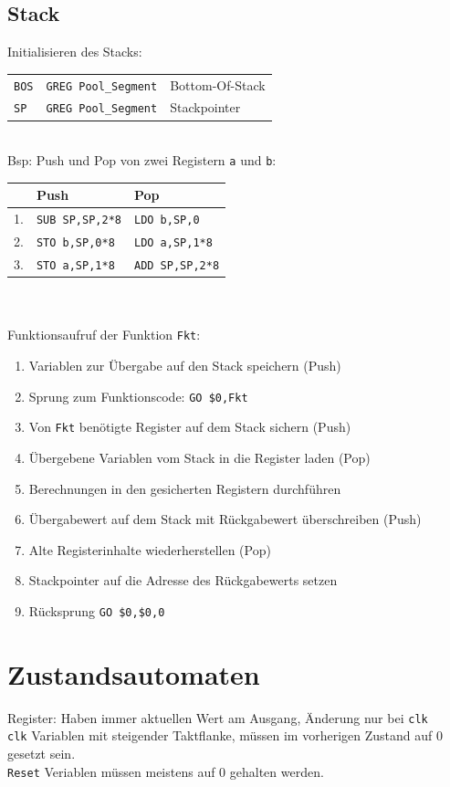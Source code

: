 \documentclass[fs]{latex4ei}
\begin{document}
\begin{multicols}{4}
		\subsection{Stack}
		Initialisieren des Stacks:\\
		\begin{tabular}{lll}
			\texttt{BOS} & \texttt{GREG Pool\_Segment} & Bottom-Of-Stack \\
			\texttt{SP} & \texttt{GREG Pool\_Segment} & Stackpointer \\
		\end{tabular}\\
		Bsp: Push und Pop von zwei Registern {\tt a} und {\tt b}:\\
		\begin{tabular}{l|l|l}
			& Push & Pop \\ \midrule
		1. 	& \texttt{SUB SP,SP,2*8} & \texttt{LDO b,SP,0}\\
		2.	& \texttt{STO b,SP,0*8} & \texttt{LDO a,SP,1*8}\\
		3.	& \texttt{STO a,SP,1*8} & \texttt{ADD SP,SP,2*8}\\
		\end{tabular}\\
		\\
		Funktionsaufruf der Funktion \texttt{Fkt}: 
		\begin{enumerate}\itemsep0pt
			\item Variablen zur Übergabe auf den Stack speichern (Push)
			\item Sprung zum Funktionscode: \texttt{GO \$0,Fkt}
			\item Von \texttt{Fkt} benötigte Register auf dem Stack sichern (Push)
			\item Übergebene Variablen vom Stack in die Register laden (Pop)
			\item Berechnungen in den gesicherten Registern durchführen
			\item Übergabewert auf dem Stack mit Rückgabewert überschreiben (Push)
			\item Alte Registerinhalte wiederherstellen (Pop)
			\item Stackpointer auf die Adresse des Rückgabewerts setzen 
			\item Rücksprung \texttt{GO \$0,\$0,0}
		\end{enumerate}

\section{Zustandsautomaten}
Register: Haben immer aktuellen Wert am Ausgang, Änderung nur bei \texttt{clk}\\
\texttt{clk} Variablen mit steigender Taktflanke, müssen im vorherigen Zustand auf 0 gesetzt sein.\\
\texttt{Reset} Veriablen müssen meistens auf 0 gehalten werden.\\
 

\end{multicols}
\end{document}
